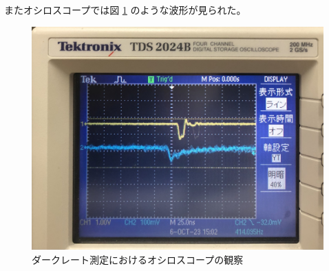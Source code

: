 \documentclass[uplatex,dvipdfmx,a4paper,11pt]{jlreq}
\numberwithin{equation}{section}
\theoremstyle{definition}
\begin{document}
またオシロスコープでは図 \ref{fig:trigger 1} のような波形が見られた。
\begin{figure}[htbp]
  \centering
  \includegraphics[width=12cm]{./assets/trigger1.jpg}
  \caption{ダークレート測定におけるオシロスコープの観察}
  \label{fig:trigger 1}
\end{figure}
\end{document}
